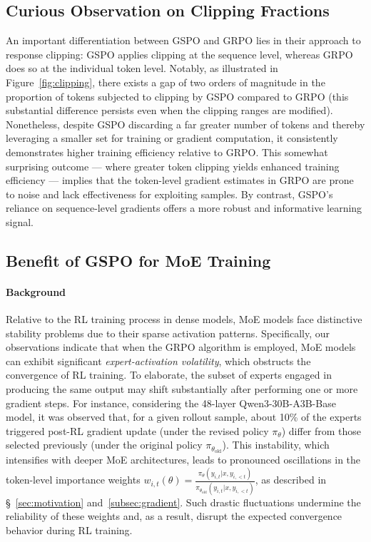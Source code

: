 \subsection{Curious Observation on Clipping Fractions}

An important differentiation between GSPO and GRPO lies in their approach to response clipping: GSPO applies clipping at the sequence level, whereas GRPO does so at the individual token level. Notably, as illustrated in Figure~\ref{fig:clipping}, there exists a gap of two orders of magnitude in the proportion of tokens subjected to clipping by GSPO compared to GRPO (this substantial difference persists even when the clipping ranges are modified). Nonetheless, despite GSPO discarding a far greater number of tokens and thereby leveraging a smaller set for training or gradient computation, it consistently demonstrates higher training efficiency relative to GRPO. This somewhat surprising outcome — where greater token clipping yields enhanced training efficiency — implies that the token-level gradient estimates in GRPO are prone to noise and lack effectiveness for exploiting samples. By contrast, GSPO’s reliance on sequence-level gradients offers a more robust and informative learning signal.

\subsection{Benefit of GSPO for MoE Training}
\label{subsec:routing_replay}

\paragraph{Background}
Relative to the RL training process in dense models, MoE models face distinctive stability problems due to their sparse activation patterns. Specifically, our observations indicate that when the GRPO algorithm is employed, MoE models can exhibit significant \textit{expert-activation volatility}, which obstructs the convergence of RL training. To elaborate, the subset of experts engaged in producing the same output may shift substantially after performing one or more gradient steps. For instance, considering the 48-layer Qwen3-30B-A3B-Base model, it was observed that, for a given rollout sample, about 10\% of the experts triggered post-RL gradient update (under the revised policy $\pi_{\theta}$) differ from those selected previously (under the original policy $\pi_{\theta_\text{old}}$). This instability, which intensifies with deeper MoE architectures, leads to pronounced oscillations in the token-level importance weights $w_{i,t}(\theta) = \frac{ \pi_{\theta} (y_{i,t} | x, y_{i,<t}) }{ \pi_{\theta_\text{old}} (y_{i,t} | x,y_{i,<t})}$, as described in \S~\ref{sec:motivation} and~\ref{subsec:gradient}. Such drastic fluctuations undermine the reliability of these weights and, as a result, disrupt the expected convergence behavior during RL training.

